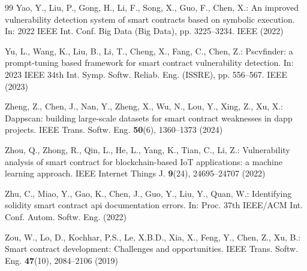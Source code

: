 \documentclass[pdflatex,sn-basic]{sn-jnl}%
\theoremstyle{thmstyleone}%
\theoremstyle{thmstyletwo}%
\theoremstyle{thmstylethree}%
\begin{document}
\begin{thebibliography}{99}
 Yao, Y., Liu, P., Gong, H., Li, F., Song, X., Guo, F., Chen, X.: An improved vulnerability detection system of smart contracts based on symbolic execution. In: 2022 IEEE Int. Conf. Big Data (Big Data), pp. 3225--3234. IEEE (2022)

 Yu, L., Wang, K., Liu, B., Li, T., Cheng, X., Fang, C., Chen, Z.: Pscvfinder: a prompt-tuning based framework for smart contract vulnerability detection. In: 2023 IEEE 34th Int. Symp. Softw. Reliab. Eng. (ISSRE), pp. 556--567. IEEE (2023)

 Zheng, Z., Chen, J., Nan, Y., Zheng, X., Wu, N., Lou, Y., Xing, Z., Xu, X.: Dappscan: building large-scale datasets for smart contract weaknesses in dapp projects. IEEE Trans. Softw. Eng. \textbf{50}(6), 1360--1373 (2024)

 Zhou, Q., Zhong, R., Qin, L., He, L., Yang, K., Tian, C., Li, Z.: Vulnerability analysis of smart contract for blockchain-based IoT applications: a machine learning approach. IEEE Internet Things J. \textbf{9}(24), 24695--24707 (2022)

 Zhu, C., Miao, Y., Gao, K., Chen, J., Guo, Y., Liu, Y., Quan, W.: Identifying solidity smart contract api documentation errors. In: Proc. 37th IEEE/ACM Int. Conf. Autom. Softw. Eng. (2022)

 Zou, W., Lo, D., Kochhar, P.S., Le, X.B.D., Xia, X., Feng, Y., Chen, Z., Xu, B.: Smart contract development: Challenges and opportunities. IEEE Trans. Softw. Eng. \textbf{47}(10), 2084--2106 (2019)

\end{thebibliography}
\end{document}
